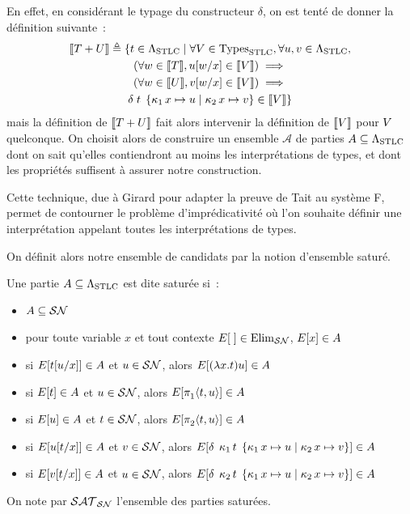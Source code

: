 En effet, en considérant le typage du constructeur $\delta$, on est tenté de
donner la définition suivante~:
\begin{multline*}
  \llbracket T + U\rrbracket \triangleq \{t \in \Lambda_{\mathrm{STLC}}\mid
  \forall V \in \operatorname{Types}_{\mathrm{STLC}}, \forall u,v \in \Lambda_{\mathrm{STLC}},
  \\(\forall w \in \llbracket T\rrbracket, u[w/x]\in \llbracket V\rrbracket) \implies\\
  (\forall w \in \llbracket U\rrbracket,v[w/x]\in\llbracket V\rrbracket) \implies
  \\\delta\;t\;\left\{\mathop{\kappa_{1}} x\mapsto u \;\middle\vert\; \mathop{\kappa_{2}} x\mapsto v\right\} \in \llbracket V\rrbracket\}
\end{multline*}
mais la définition de $\llbracket T+U\rrbracket$ fait alors intervenir la
définition de $\llbracket V\rrbracket$ pour $V$ quelconque. On choisit alors de
construire un ensemble $\mathscr A$ de parties $A\subseteq \Lambda_{\mathrm{STLC}}$ dont on
sait qu'elles contiendront au moins les interprétations de types, et dont les
propriétés suffisent à assurer notre construction.

Cette technique, due à Girard pour adapter la preuve de Tait au système F,
permet de contourner le problème d'imprédicativité où l'on souhaite définir
une interprétation appelant toutes les interprétations de types.

On définit alors notre ensemble de candidats par la notion d'ensemble saturé.

\begin{definition}
  Une partie $A\subseteq\Lambda_{\mathrm{STLC}}$ est dite saturée si~:
  \begin{itemize}
  \item $A\subseteq \mathcal{SN}$
  \item pour toute variable $x$ et tout contexte $E[\;]\in\mathrm{Elim}_{\mathcal{SN}}$, 
    $E[x]\in A$
  \item si $E[t[u/x]] \in A$ et $u \in \mathcal{SN}$, alors
    $E[(\lambda x.t)u] \in A$
  \item si $E[t] \in A$ et $u \in \mathcal{SN}$, alors
    $E[\mathop{\pi_{1}^{}}\langle t,u\rangle]\in A$
  \item si $E[u] \in A$ et $t \in \mathcal{SN}$, alors
    $E[\mathop{\pi_{2}^{}}\langle t,u\rangle]\in A$
  \item si $E[u[t/x]] \in A$ et $v \in \mathcal{SN}$, alors
    $E[\delta\;\mathop{\kappa_{1}}t\;\left\{\mathop{\kappa_{1}} x\mapsto u \;\middle\vert\; \mathop{\kappa_{2}} x\mapsto v\right\}] \in A$
  \item si $E[v[t/x]] \in A$ et $u \in \mathcal{SN}$, alors
    $E[\delta\;\mathop{\kappa_{2}}t\;\left\{\mathop{\kappa_{1}} x\mapsto u \;\middle\vert\; \mathop{\kappa_{2}} x\mapsto v\right\}] \in A$
  \end{itemize}
  On note par $\mathcal{SAT}_{\mathcal{SN}}$ l'ensemble des parties saturées.
\end{definition}

